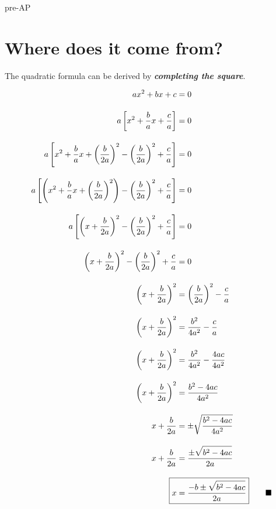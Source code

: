 
\begin{taggedblock}{pre-AP}

    \section*{Where does it come from?}

The quadratic formula can be derived by 
{\bfseries\itshape completing the square}.

\begin{minipage}{0.5\textwidth}
{\large
\begin{align*}
    a x^2 + bx + c &= 0 
    \\[1em]
    a \left[ 
        x^2 + \frac{b}{a}x + \frac{c}{a} 
    \right] &= 0 
    \\[1em]
    a \left[ 
        x^2 + \frac{b}{a}x    
        + \left( \frac{b}{2a} \right)^2 
        - \left( \frac{b}{2a} \right)^2 
        +     \frac{c}{a} 
    \right] &= 0 
    \\[1em]
    a \left[ 
        \left(
            x^2 
            + \frac{b}{a}x    
            + \left( \frac{b}{2a} \right)^2 
        \right)
        - \left( \frac{b}{2a} \right)^2 
        +     \frac{c}{a} 
    \right] &= 0 
    \\[1em]
    a \left[ 
        \left(
            x + \frac{b}{2a}
        \right)^2
        - \left( \frac{b}{2a} \right)^2 
        +     \frac{c}{a} 
    \right] &= 0 
    \\[1em]
    \left(
        x + \frac{b}{2a}
    \right)^2
    - \left( \frac{b}{2a} \right)^2 
    +     \frac{c}{a} 
    &= 0 
    \\[1em]
    \left(
        x + \frac{b}{2a}
    \right)^2
    &=
     \left( \frac{b}{2a} \right)^2 
         - \frac{c}{a} 
         \\[1em]
    \left(
        x + \frac{b}{2a}
    \right)^2
    &=
     \frac{b^2}{4a^2} - \frac{c}{a} 
     \\[1em]
    \left(
        x + \frac{b}{2a}
    \right)^2
    &=
     \frac{b^2}{4a^2} - \frac{4ac}{4a^2} 
     \\[1em]
    \left(
        x + \frac{b}{2a}
    \right)^2
    &=
     \frac{b^2-4ac}{4a^2} 
     \\[1em]
    x + \frac{b}{2a}
    &=
    \pm \sqrt{   \frac{b^2-4ac}{4a^2}   }
    \\[1em]
    x + \frac{b}{2a}
    &=
    \frac{\pm\sqrt{ \rule{0pt}{2.3ex} b^2-4ac}}{2a}
    \\[1em]
    \Aboxed{
        x &= \frac{-b\pm\sqrt{ \rule{0pt}{2.3ex} b^2-4ac}}{2a}
    }\qquad\blacksquare
\end{align*}
}
\end{minipage}

\end{taggedblock}